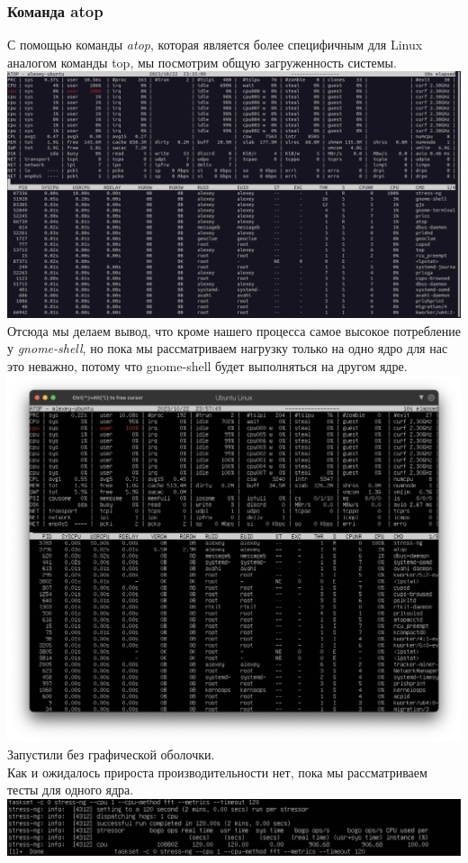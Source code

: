 \documentclass[12pt,onecolumn]{article}
\begin{document}
\subsubsection{Команда atop}
С помощью команды \textit{atop}, которая является более специфичным для Linux аналогом команды top, мы посмотрим общую загруженность системы.\\
\includegraphics[width=\textwidth]{image/atop2.png}
Отсюда мы делаем вывод, что кроме нашего процесса самое высокое потребление у \textit{gnome-shell}, но пока мы рассматриваем нагрузку только на одно ядро для нас это неважно, потому что gnome-shell будет выполняться на другом ядре.\\
\includegraphics[width=\textwidth]{image/atop3.png}
Запустили без графической оболочки. \\
Как и ожидалось прироста производительности нет, пока мы рассматриваем тесты для одного ядра.\\
\includegraphics[width=\textwidth]{image/gnome.png}
\end{document}
